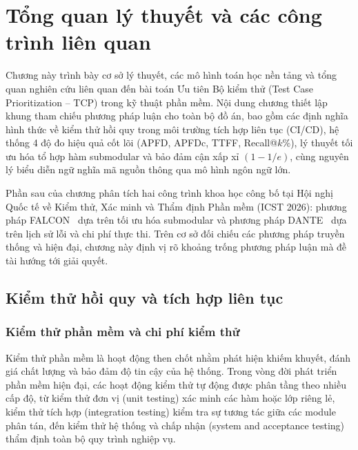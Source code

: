 \section{Tổng quan lý thuyết và các công trình liên quan}
\label{sec:literature_review}

Chương này trình bày cơ sở lý thuyết, các mô hình toán học nền tảng và tổng quan nghiên cứu liên quan đến bài toán Ưu tiên Bộ kiểm thử (Test Case Prioritization -- TCP) trong kỹ thuật phần mềm. Nội dung chương thiết lập khung tham chiếu phương pháp luận cho toàn bộ đồ án, bao gồm các định nghĩa hình thức về kiểm thử hồi quy trong môi trường tích hợp liên tục (CI/CD), hệ thống 4 độ đo hiệu quả cốt lõi (APFD, APFDc, TTFF, Recall@$k\%$), lý thuyết tối ưu hóa tổ hợp hàm submodular và bảo đảm cận xấp xỉ $(1 - 1/e)$, cùng nguyên lý biểu diễn ngữ nghĩa mã nguồn thông qua mô hình ngôn ngữ lớn.

Phần sau của chương phân tích hai công trình khoa học công bố tại Hội nghị Quốc tế về Kiểm thử, Xác minh và Thẩm định Phần mềm (ICST 2026): phương pháp FALCON~\cite{falcon2026} dựa trên tối ưu hóa submodular và phương pháp DANTE~\cite{dante2026} dựa trên lịch sử lỗi và chi phí thực thi. Trên cơ sở đối chiếu các phương pháp truyền thống và hiện đại, chương này định vị rõ khoảng trống phương pháp luận mà đề tài hướng tới giải quyết.

\subsection{Kiểm thử hồi quy và tích hợp liên tục}
\label{subsec:regression_testing_ci}

\subsubsection{Kiểm thử phần mềm và chi phí kiểm thử}
\label{subsubsec:software_testing}

Kiểm thử phần mềm là hoạt động then chốt nhằm phát hiện khiếm khuyết, đánh giá chất lượng và bảo đảm độ tin cậy của hệ thống. Trong vòng đời phát triển phần mềm hiện đại, các hoạt động kiểm thử tự động được phân tầng theo nhiều cấp độ, từ kiểm thử đơn vị (unit testing) xác minh các hàm hoặc lớp riêng lẻ, kiểm thử tích hợp (integration testing) kiểm tra sự tương tác giữa các module phân tán, đến kiểm thử hệ thống và chấp nhận (system and acceptance testing) thẩm định toàn bộ quy trình nghiệp vụ.

